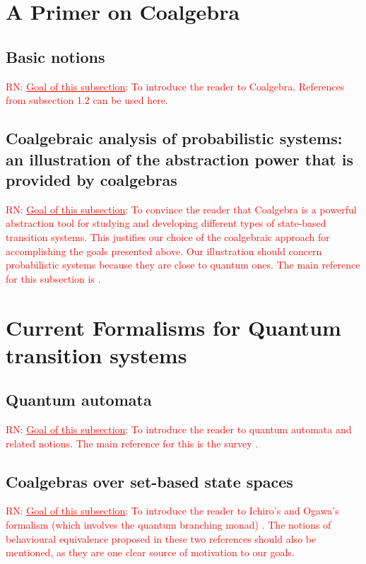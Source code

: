 \documentclass[a4paper, 11pt]{article}
\newcommand{\nevComment}[1]{\textcolor{red}{RN: #1}}
\begin{document}
\section{A Primer on Coalgebra}

\subsection{Basic notions}

\nevComment{\underline{Goal of this subsection}: To introduce the reader
to Coalgebra. References from subsection 1.2 can be used here.}


\subsection{Coalgebraic analysis of probabilistic systems: an
  illustration of the abstraction power that is provided by coalgebras}

\nevComment{\underline{Goal of this subsection}: To convince the
  reader that Coalgebra is a powerful abstraction tool for studying
  and developing different types of state-based transition systems.
  This justifies our choice of the coalgebraic approach for
  accomplishing the goals presented above. Our illustration should concern
  probabilistic systems because they are close to quantum ones. The
  main reference for this subsection is \cite{sokolova}.}


\section{Current Formalisms for Quantum transition systems}

\subsection{Quantum automata}

\nevComment{\underline{Goal of this subsection}: To introduce the
  reader to quantum automata and related notions. The main reference for this is the
  survey \cite{hirvensalo11}.}

\subsection{Coalgebras over set-based state spaces}

\nevComment{\underline{Goal of this subsection}: To introduce the
reader to Ichiro's and Ogawa's formalism (which involves the quantum
branching monad) \cite{hasuo17,ogawa14}. The notions of behavioural
equivalence proposed in these two references should also be mentioned, as they are one
clear source of motivation to our goals.}
\end{document}
